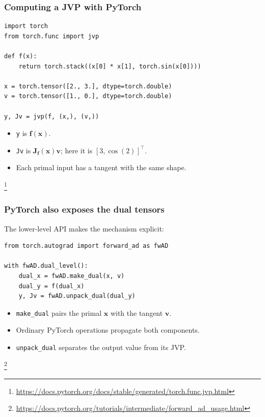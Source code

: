 \documentclass[]{article}
\newcommand\blfootnote[1]{%
  \begingroup
  \renewcommand\thefootnote{}\footnote{#1}%
  \addtocounter{footnote}{-1}%
  \endgroup
}
\begin{document}
\begin{frame}[fragile]
\frametitle{Computing a JVP with PyTorch}

\begin{lstlisting}
import torch
from torch.func import jvp

def f(x):
    return torch.stack((x[0] * x[1], torch.sin(x[0])))

x = torch.tensor([2., 3.], dtype=torch.double)
v = torch.tensor([1., 0.], dtype=torch.double)

y, Jv = jvp(f, (x,), (v,))
\end{lstlisting}

\begin{itemize}
	\item \texttt{y} is $\bm{f}(\bm{x})$.
	\item \texttt{Jv} is $\bm{J}_{\bm{f}}(\bm{x})\bm{v}$; here it is $[3,\cos(2)]^\top$.
	\item Each primal input has a tangent with the same shape.
\end{itemize}
\blfootnote{\url{https://docs.pytorch.org/docs/stable/generated/torch.func.jvp.html}}
\end{frame}


\begin{frame}[fragile]
\frametitle{PyTorch also exposes the dual tensors}

The lower-level API makes the mechanism explicit:
\begin{lstlisting}
from torch.autograd import forward_ad as fwAD

with fwAD.dual_level():
    dual_x = fwAD.make_dual(x, v)
    dual_y = f(dual_x)
    y, Jv = fwAD.unpack_dual(dual_y)
\end{lstlisting}

\begin{itemize}
	\item \texttt{make\_dual} pairs the primal $\bm{x}$ with the tangent $\bm{v}$.
	\item Ordinary PyTorch operations propagate both components.
	\item \texttt{unpack\_dual} separates the output value from its JVP.
\end{itemize}

\blfootnote{\url{https://docs.pytorch.org/tutorials/intermediate/forward_ad_usage.html}}
\end{frame}
\end{document}

